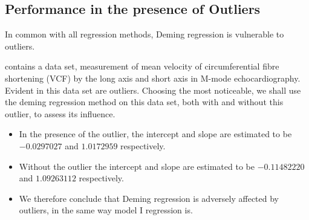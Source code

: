 \documentclass[12pt, a4paper]{report}
\theoremstyle{plain}
\theoremstyle{definition}
\theoremstyle{remark}
\begin{document}
	
\subsection{Performance in the presence of Outliers}
In common with all regression methods, Deming regression is vulnerable to outliers. 
	
\citet{BA86} contains a data set, measurement of mean velocity of circumferential fibre shortening (VCF) by the long axis and short axis in M-mode echocardiography. Evident in this data set are outliers. Choosing the most noticeable, we shall use the deming regression method on this data set, both with and
	without this outlier, to assess its influence.
	\begin{itemize}
		\item In the presence of the outlier, the intercept and slope are estimated to be $-0.0297027$ and $1.0172959$ respectively.
		\item Without the outlier the intercept and slope are estimated to be
		$-0.11482220$ and  $1.09263112$ respectively.
		\item We therefore conclude that Deming regression is adversely affected
		by outliers, in the same way model I regression is.
	\end{itemize}
	
	
	
	
	
	
	
	
	
	
	
	
	
	
	
	


	
	

	

	
	
	
	
\end{document}
